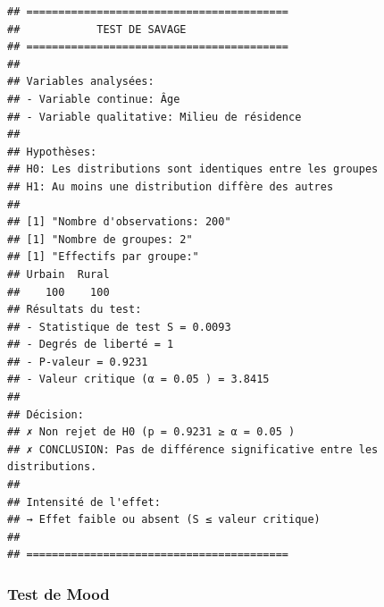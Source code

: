\documentclass[
  12pt,
]{article}
\begin{document}
\begin{verbatim}
## =========================================
##            TEST DE SAVAGE
## =========================================
## 
## Variables analysées:
## - Variable continue: Âge 
## - Variable qualitative: Milieu de résidence 
## 
## Hypothèses:
## H0: Les distributions sont identiques entre les groupes
## H1: Au moins une distribution diffère des autres
## 
## [1] "Nombre d'observations: 200"
## [1] "Nombre de groupes: 2"
## [1] "Effectifs par groupe:"
## Urbain  Rural 
##    100    100 
## Résultats du test:
## - Statistique de test S = 0.0093 
## - Degrés de liberté = 1 
## - P-valeur = 0.9231 
## - Valeur critique (α = 0.05 ) = 3.8415 
## 
## Décision:
## ✗ Non rejet de H0 (p = 0.9231 ≥ α = 0.05 )
## ✗ CONCLUSION: Pas de différence significative entre les distributions.
## 
## Intensité de l'effet:
## → Effet faible ou absent (S ≤ valeur critique)
## 
## =========================================
\end{verbatim}

\subsubsection{Test de Mood}\label{test-de-mood}
\end{document}
